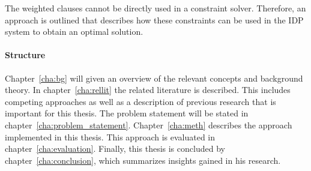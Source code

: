 The weighted clauses cannot be directly used in a constraint solver.
Therefore, an approach is outlined that describes how these constraints can be used in the IDP system to obtain an optimal solution.

\paragraph{Structure}
Chapter~\ref{cha:bg} will given an overview of the relevant concepts and background theory. In chapter~\ref{cha:rellit} the related literature is described. This includes competing approaches as well as a description of previous research that is important for this thesis. The problem statement will be stated in chapter~\ref{cha:problem_statement}. Chapter~\ref{cha:meth} describes the approach implemented in this thesis. This approach is evaluated in chapter~\ref{cha:evaluation}. Finally, this thesis is concluded by chapter~\ref{cha:conclusion}, which summarizes insights gained in his research.